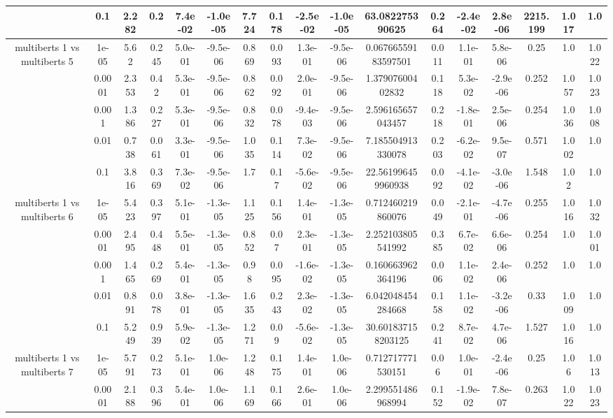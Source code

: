 \begin{tabular}{|c|c|c|c|c|c|c|c|c|c|c|c|c|c|c|c|c|}
 & 0.1 & 2.282 & 0.2 & 7.4e-02 & -1.0e-05 & 7.724 & 0.178 & -2.5e-02 & -1.0e-05 & 63.082275390625 & 0.264 & -2.4e-02 & 2.8e-06 & 2215.199 & 1.017 & 1.0 \\
\hline
\multirow{5}{*}{multiberts 1 vs multiberts 5} & 1e-05 & 5.62 & 0.245 & 5.0e-01 & -9.5e-06 & 0.869 & 0.093 & 1.3e-01 & -9.5e-06 & 0.06766559183597501 & 0.011 & 1.1e-01 & 5.8e-06 & 0.25 & 1.0 & 1.022 \\
 & 0.0001 & 2.353 & 0.42 & 5.3e-01 & -9.5e-06 & 0.862 & 0.092 & 2.0e-01 & -9.5e-06 & 1.37907600402832 & 0.118 & 5.3e-02 & -2.9e-06 & 0.252 & 1.057 & 1.023 \\
 & 0.001 & 1.386 & 0.227 & 5.3e-01 & -9.5e-06 & 0.832 & 0.078 & -9.4e-03 & -9.5e-06 & 2.596165657043457 & 0.218 & -1.8e-01 & 2.5e-06 & 0.254 & 1.036 & 1.008 \\
 & 0.01 & 0.738 & 0.061 & 3.3e-01 & -9.5e-06 & 1.035 & 0.114 & 7.3e-02 & -9.5e-06 & 7.185504913330078 & 0.203 & -6.2e-02 & 9.5e-07 & 0.571 & 1.002 & 1.0 \\
 & 0.1 & 3.816 & 0.369 & 7.3e-02 & -9.5e-06 & 1.7 & 0.17 & -5.6e-02 & -9.5e-06 & 22.561996459960938 & 0.092 & -4.1e-02 & -3.0e-06 & 1.548 & 1.02 & 1.0 \\
\hline
\multirow{5}{*}{multiberts 1 vs multiberts 6} & 1e-05 & 5.423 & 0.397 & 5.1e-01 & -1.3e-05 & 1.125 & 0.156 & 1.4e-01 & -1.3e-05 & 0.712460219860076 & 0.049 & -2.1e-01 & -4.7e-06 & 0.255 & 1.016 & 1.032 \\
 & 0.0001 & 2.495 & 0.448 & 5.5e-01 & -1.3e-05 & 0.852 & 0.07 & 2.3e-01 & -1.3e-05 & 2.252103805541992 & 0.385 & 6.7e-02 & 6.6e-06 & 0.254 & 1.0 & 1.001 \\
 & 0.001 & 1.465 & 0.269 & 5.4e-01 & -1.3e-05 & 0.98 & 0.095 & -1.6e-02 & -1.3e-05 & 0.160663962364196 & 0.006 & 1.1e-02 & 2.4e-06 & 0.252 & 1.0 & 1.0 \\
 & 0.01 & 0.891 & 0.078 & 3.8e-01 & -1.3e-05 & 1.635 & 0.243 & 2.3e-02 & -1.3e-05 & 6.042048454284668 & 0.158 & 1.1e-02 & -3.2e-06 & 0.33 & 1.009 & 1.0 \\
 & 0.1 & 5.249 & 0.939 & 5.9e-02 & -1.3e-05 & 1.271 & 0.09 & -5.6e-02 & -1.3e-05 & 30.601837158203125 & 0.241 & 8.7e-02 & 4.7e-06 & 1.527 & 1.016 & 1.0 \\
\hline
\multirow{5}{*}{multiberts 1 vs multiberts 7} & 1e-05 & 5.791 & 0.273 & 5.1e-01 & 1.0e-06 & 1.248 & 0.175 & 1.4e-01 & 1.0e-06 & 0.712717771530151 & 0.06 & 1.0e-01 & -2.4e-06 & 0.25 & 1.06 & 1.013 \\
 & 0.0001 & 2.188 & 0.396 & 5.4e-01 & 1.0e-06 & 1.169 & 0.166 & 2.6e-01 & 1.0e-06 & 2.299551486968994 & 0.152 & -1.9e-02 & 7.8e-07 & 0.263 & 1.022 & 1.023 \\

\end{tabular}
